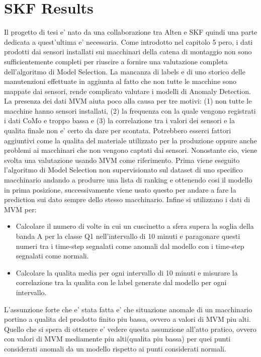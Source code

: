 \section{SKF Results}
Il progetto di tesi e' nato da una collaborazione tra Alten e SKF quindi una parte dedicata a quest'ultima e' necessaria. Come introdotto nel capitolo 5 pero, i dati prodotti dai sensori installati sui macchinari della catena di montaggio non sono sufficientemente completi per riuscire a fornire una valutazione completa dell'algoritmo di Model Selection. La mancanza di labels e di uno storico delle manutenzioni effettuate in aggiunta al fatto che non tutte le macchine sono mappate dai sensori, rende complicato valutare i modelli di Anomaly Detection. La presenza dei dati MVM aiuta poco alla causa per tre motivi: (1) non tutte le macchine hanno sensori installati, (2) la frequenza con la quale vengono registrati i dati CoMo e troppo bassa e (3) la correlazione tra i valori dei sensori e la qualita finale non e' certo da dare per scontata. Potrebbero esserci fattori aggiuntivi come la qualita del materiale utilizzato per la produzione oppure anche problemi ai macchinari che non vengono captati dai sensori. 
Nonostante cio, viene svolta una valutazione usando MVM come riferimento. Prima viene eseguito l'algoritmo di Model Selection non supervisionato sul dataset di uno specifico macchinario andando a produrre una lista di ranking e ottenendo cosi il modello in prima posizione, successivamente viene usato questo per andare a fare la prediction sui dato sempre dello stesso macchinario. Infine si utilizzano i dati di MVM per:
\begin{itemize}
	\item Calcolare il numero di volte in cui un cuscinetto a sfera supera la soglia della banda A per la classe Q1 nell'intervallo di 10 minuti e paragonare questi numeri tra i time-step segnalati come anomali dal modello con i time-step segnalati come normali.
	\item Calcolare la qualita media per ogni intervallo di 10 minuti e misurare la correlazione tra la qualita con le label generate dal modello per ogni intervallo.
\end{itemize}
L'assunzione forte che e' stata fatta e' che situazione anomale di un macchinario portino a qualita del prodotto finito piu bassa, ovvero a valori di MVM piu alti. Quello che si spera di ottenere e' vedere questa assunzione all'atto pratico, ovvero con valori di MVM mediamente piu alti(qualita piu bassa) per quei punti considerati anomali da un modello rispetto ai punti considerati normali.


